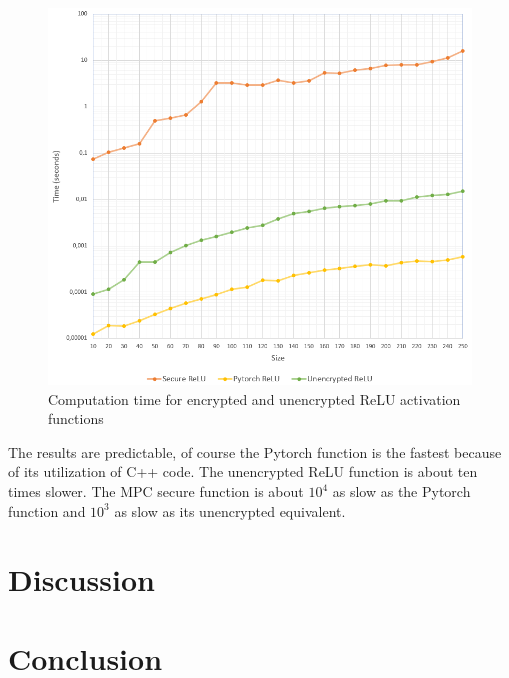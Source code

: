 \begin{figure}[H]
  \includegraphics[scale=0.7]{fig/relu_tests.png}
  \centering
  \caption{Computation time for encrypted and unencrypted ReLU activation functions}
  \label{fig:relu_tests}
\end{figure}

The results are predictable, of course the Pytorch function is the fastest because of its utilization of C++ code. The unencrypted ReLU function is about ten times slower. The MPC secure function is about $10^4$ as slow as the Pytorch function and $10^3$ as slow as its unencrypted equivalent.

\section{Discussion}

\section{Conclusion}
